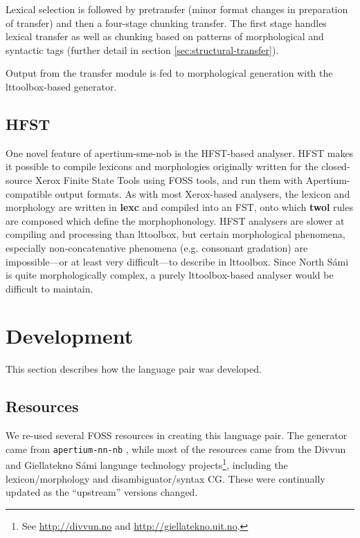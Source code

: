 Lexical selection is followed by pretransfer (minor format changes in
preparation of transfer) and then a four-stage chunking transfer. The
first stage handles lexical transfer as well as chunking based on
patterns of morphological and syntactic tags (further detail in
section \ref{sec:structural-transfer}).

Output from the transfer module is fed to morphological generation
with the lttoolbox-based \nob{} generator.

\subsection{HFST}
\label{sec:hfst}
One novel feature of apertium-sme-nob is the HFST-based analyser. HFST
makes it possible to compile lexicons and morphologies originally
written for the closed-source Xerox Finite State Tools using FOSS
tools, and run them with Apertium-compatible output formats. As with
most Xerox-based analysers, the \sme{} lexicon and morphology are
written in \textbf{lexc} and compiled into an FST, onto which
\textbf{twol} rules are composed which define the morphophonology.
HFST analysers are slower at compiling and processing than lttoolbox,
but certain morphological phenomena, especially non-concatenative
phenomena (e.g. \sme{} consonant gradation) are impossible---or at
least very difficult---to describe in lttoolbox. Since North S\'{a}mi
is quite morphologically complex, a purely lttoolbox-based analyser
would be difficult to maintain.


\section{Development}
  \label{sec:development}

This section describes how the language pair was developed.
\subsection{Resources}
We re-used several FOSS resources in creating this language pair. The
\nob{} generator came from {\tt apertium-nn-nb}
\citep{unhammer2009rfr}, while most of the \sme{} resources came from
the Divvun and Giellatekno S\'{a}mi language technology
projects\footnote{See \href{http://divvun.no}{http://divvun.no} and
  \href{http://giellatekno.uit.no}{http://giellatekno.uit.no}.},
including the lexicon/morphology and disambiguator/syntax CG. These
were continually updated as the ``upstream'' versions changed.

